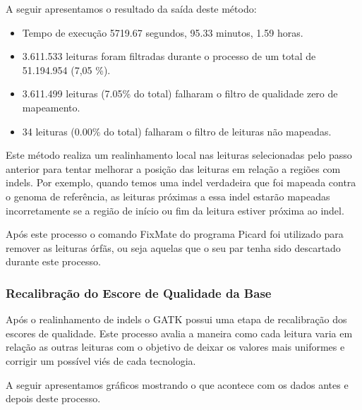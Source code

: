 A seguir apresentamos o resultado da saída deste método:

\begin{itemize}
  \item Tempo de execução 5719.67 segundos, 95.33 minutos, 1.59 horas.
  \item 3.611.533 leituras foram filtradas durante o processo de um total de 51.194.954 (7,05 \%).
  \item 3.611.499 leituras (7.05\% do total) falharam o filtro de qualidade zero de mapeamento.
  \item 34 leituras (0.00\% do total) falharam o filtro de leituras não mapeadas.
\end{itemize}



Este método realiza um realinhamento local nas leituras selecionadas pelo passo anterior para tentar melhorar a posição das leituras em relação a regiões com indels. Por exemplo, quando temos uma indel verdadeira que foi mapeada contra o genoma de referência, as leituras próximas a essa indel estarão mapeadas incorretamente se a região de início ou fim da leitura estiver próxima ao indel.

Após este processo o comando FixMate do programa Picard foi utilizado para remover as leituras órfãs, ou seja aquelas que o seu par tenha sido descartado durante este processo.

\subsubsection{Recalibração do Escore de Qualidade da Base}

Após o realinhamento de indels o GATK possui uma etapa de recalibração dos escores de qualidade. Este processo avalia a maneira como cada leitura varia em relação as outras leituras com o objetivo de deixar os valores mais uniformes e corrigir um possível viés de cada tecnologia.

A seguir apresentamos gráficos mostrando o que acontece com os dados antes e depois deste processo.


